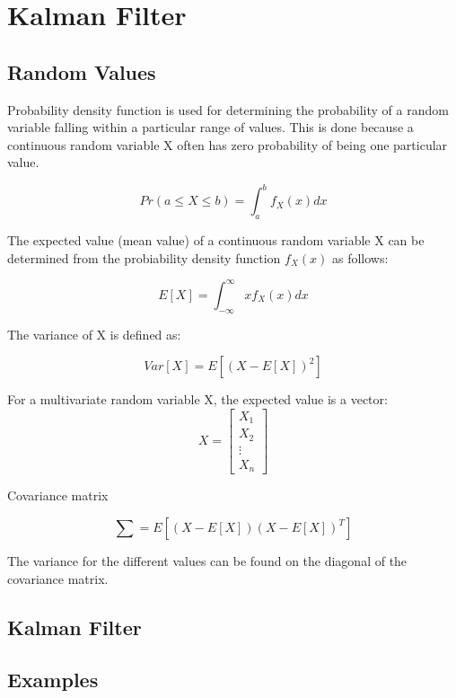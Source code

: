 \section{Kalman Filter}

\subsection{Random Values}

Probability density function is used for determining
the probability of a random variable falling within a particular range of values.
This is done because a continuous random variable X often has zero probability of being one particular value.

$$ Pr(a \leq X \leq b) = \int_{a}^{b} f_X(x) dx $$


The expected value (mean value) of a continuous random variable X
can be determined from the probiability density function $f_X(x)$ as follows:

$$ E[X] = \int_{-\infty}^{\infty} x f_X(x) dx $$

The variance of X is defined as:

$$ Var[X] = E[(X - E[X])^2] $$


For a multivariate random variable X, the expected value is a vector:
$$ X = \begin{bmatrix} X_1 \\ X_2 \\ \vdots \\ X_n \end{bmatrix} $$

Covariance matrix

$$ \sum = E[(X - E[X])(X - E[X])^T] $$

The variance for the different values can be found on the diagonal of the covariance matrix.



\subsection{Kalman Filter}



\subsection{Examples}

